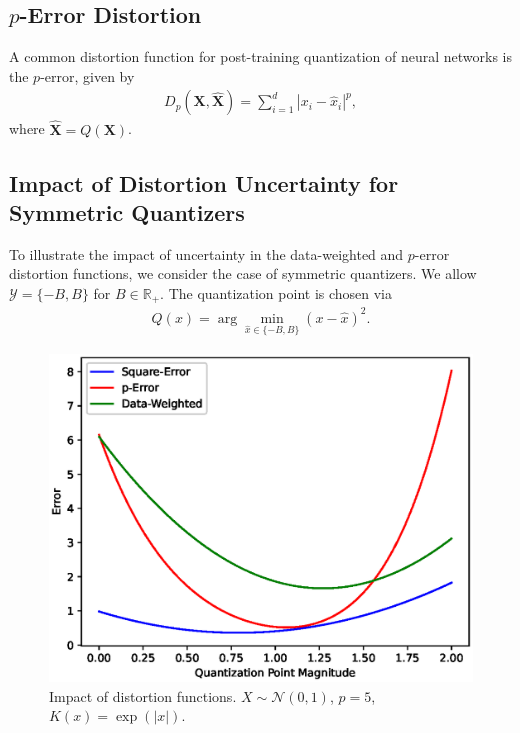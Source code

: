 \documentclass[conference]{IEEEtran}
\begin{document}
\subsection{$p$-Error Distortion}

A common distortion function for post-training quantization of neural networks \cite{Nahshan2021loss} is the $p$-error, given by 
\begin{align}
D_p(\mathbf{X},\hat{\mathbf{X}}) = \sum_{i=1}^d |x_i - \hat{x}_i|^p,
\end{align}  
where $\hat{\mathbf{X}} = Q(\mathbf{X})$. 

\subsection{Impact of Distortion Uncertainty for Symmetric Quantizers}

To illustrate the impact of uncertainty in the data-weighted and $p$-error distortion functions, we consider the case of symmetric quantizers. We allow $\mathcal{Y} = \{-B,B\}$ for $B \in \mathbb{R}_+$. The quantization point is chosen via 
\begin{align}
Q(x) = \arg\min_{\hat{x} \in \{-B,B\}} (x - \hat{x})^2.
\end{align}

\begin{figure}
\centering
\includegraphics[width=\linewidth]{impact_distortion.eps}%
\caption{Impact of distortion functions. $X \sim \mathcal{N}(0,1)$, $p = 5$, $K(x) = \exp(|x|)$.}
\label{fig:impact_distortion}
\end{figure}
\end{document}
